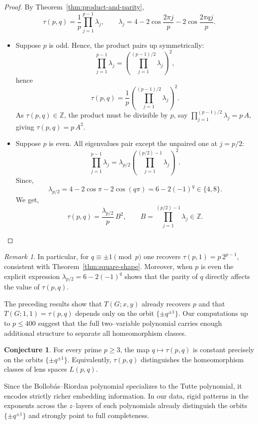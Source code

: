 \documentclass[pdflatex,sn-mathphys-num]{sn-jnl}%
\theoremstyle{plain}
\theoremstyle{definition}
\newtheorem{conjecture}{Conjecture}
\theoremstyle{remark}
\newtheorem*{remark}{Remark}
\begin{document}
\begin{proof}
By Theorem~\ref{thm:product-and-parity},
\[
\tau(p,q)=\frac{1}{p}\prod_{j=1}^{p-1}\lambda_j,
\qquad 
\lambda_j=4-2\cos\frac{2\pi j}{p}-2\cos\frac{2\pi q j}{p}.
\]

\begin{itemize}
    \item[(a)] Suppose $p$ is odd. Hence, the product pairs up symmetrically:
\[
\prod_{j=1}^{p-1}\lambda_j=\left(\prod_{j=1}^{(p-1)/2}\lambda_j\right)^2,
\]
hence
\[
\tau(p,q)=\frac{1}{p}\left(\prod_{j=1}^{(p-1)/2}\lambda_j\right)^2.
\]
As $\tau(p,q)\in\mathbb{Z}$, the product must be divisible by $p$, say $\prod_{j=1}^{(p-1)/2}\lambda_j=p\,A$, giving $\tau(p,q)=p\,A^2$.

\item[(b)] Suppose $p$ is even. All eigenvalues pair except the unpaired one at $j=p/2$:
\[
\prod_{j=1}^{p-1}\lambda_j=\lambda_{p/2}\left(\prod_{j=1}^{(p/2)-1}\lambda_j\right)^2.
\]
Since,
\[
\lambda_{p/2}=4-2\cos\pi-2\cos(q\pi)=6-2(-1)^q\in\{4,8\}.
\]
We get,
\[
\tau(p,q)=\frac{\lambda_{p/2}}{p}\,B^2,
\qquad B=\prod_{j=1}^{(p/2)-1}\lambda_j \in\mathbb{Z}.
\]  
\end{itemize}
\end{proof}

\begin{remark}
In particular, for $q\equiv\pm1\pmod p$ one recovers $\tau(p,1)=p\,2^{p-1}$, consistent with Theorem~\ref{thm:square-shape}. Moreover, when $p$ is even the explicit expression $\lambda_{p/2}=6-2(-1)^q$ shows that the parity of $q$ directly affects the value of $\tau(p,q)$.
\end{remark}

The preceding results show that $T(G;x,y)$ already recovers $p$ and that $T(G;1,1)=\tau(p,q)$ depends only on the orbit $\{\pm q^{\pm1}\}$. Our computations up to $p\le 400$ suggest that the full two–variable polynomial carries enough additional structure to separate all homeomorphism classes.

\begin{conjecture}\label{conj:tau-injective} For every prime $p\ge3$, the map $q\mapsto \tau(p,q)$ is constant precisely on the orbits $\{\pm q^{\pm1}\}$. Equivalently, $\tau(p,q)$ distinguishes the homeomorphism classes of lens spaces $L(p,q)$. \end{conjecture}

{Since the Bollobás--Riordan polynomial specializes to the Tutte polynomial, it encodes strictly richer embedding information. In our data, rigid patterns in the exponents across the $z$–layers of such polynomials already distinguish the orbits $\{\pm q^{\pm1}\}$ and strongly point to full completeness.}
\end{document}
